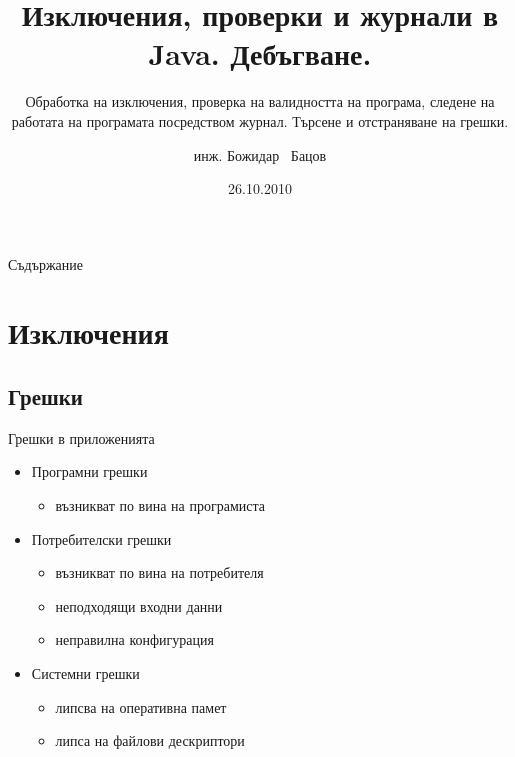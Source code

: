 \documentclass{beamer}
\title{Изключения, проверки и журнали в Java. Дебъгване.}
\subtitle
{Обработка на изключения, проверка на валидността на програма, следене
на работата на програмата посредством журнал. Търсене и отстраняване
на грешки.}
\author{инж. Божидар ~Бацов}
\institute{Drow Ltd.}
\date{26.10.2010}
\begin{document}
\begin{frame}
  \titlepage
\end{frame}

\begin{frame}{Съдържание}
  \tableofcontents
\end{frame}




\section{Изключения}

\subsection{Грешки}

\begin{frame}{Грешки в приложенията}
  \begin{itemize}
  \item Програмни грешки
    \begin{itemize}
      \item възникват по вина на програмиста
    \end{itemize}
  \item Потребителски грешки
      \begin{itemize}
        \item възникват по вина на потребителя
        \item неподходящи входни данни
        \item неправилна конфигурация
      \end{itemize}
  \item Системни грешки
  \begin{itemize}
    \item липсва на оперативна памет
    \item липса на файлови дескриптори
  \end{itemize}

  \end{itemize}
\end{frame}
\end{document}
